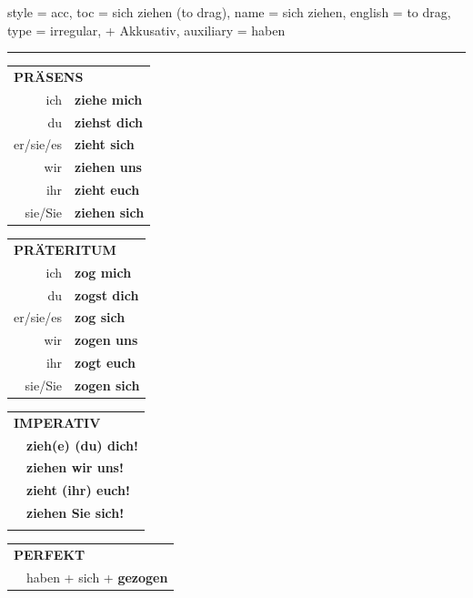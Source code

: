 \begin{verbentry}{
  style = {acc},
  toc = {sich ziehen (to drag)},
  name = {sich ziehen},
  english = {to drag},
  type = {irregular, + Akkusativ},
  auxiliary = {haben}
}
 
    
       \vspace{5pt}

    \hrule
    
    \vspace{5pt}

  \begin{tabular}{rl}
     \multicolumn{2}{l}{\textbf{PRÄSENS} }\\
    ich & \textbf{ziehe mich}\\
    du & \textbf{ziehst dich}\\
    er/sie/es & \textbf{zieht sich}\\
    wir & \textbf{ziehen uns}\\
    ihr & \textbf{zieht euch}\\
    sie/Sie & \textbf{ziehen sich}\\
  \end{tabular}
  \hfill
     \begin{tabular}{rl}
    \multicolumn{2}{l}{\textbf{PRÄTERITUM} }\\
    ich & \textbf{zog mich}\\
    du & \textbf{zogst dich}\\
    er/sie/es & \textbf{zog sich}\\
    wir & \textbf{zogen uns}\\
    ihr & \textbf{zogt euch}\\
    sie/Sie & \textbf{zogen sich}\\
  \end{tabular}
  \hfill
  \begin{tabular}{rl}
     \multicolumn{2}{l}{\textbf{IMPERATIV} }\\
   & \textbf{zieh(e) (du) dich!}\\
   & \textbf{ziehen wir uns!}\\
   & \textbf{zieht (ihr) euch!}\\
   & \textbf{ziehen Sie sich!}\\
   & \vspace{10pt}
  \end{tabular}

    \vspace{10pt}

 \begin{tabular}{rl}
     \multicolumn{2}{l}{\textbf{PERFEKT}}\\
    &haben + sich + \textbf{gezogen}\\
  \end{tabular}
\hfill
   \begin{tabular}{rl}
   

\end{tabular}
\end{verbentry}
